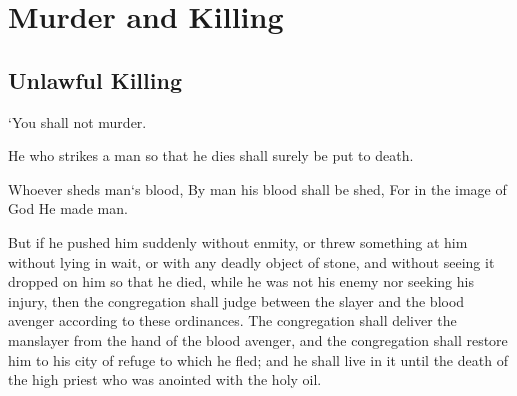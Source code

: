 \chapter{Murder and Killing}

\section{Unlawful Killing}

\begin{scripture}[Exodus 20:13]
    `You shall not murder.
\end{scripture}

\vspace{1\baselineskip}

\begin{scripture}[Exodus 21:12]
    He who strikes a man so that he dies shall surely be put to death.
\end{scripture}

\vspace{1\baselineskip}

\begin{scripture}[Genesis 9:6]
    Whoever sheds man`s blood, By man his blood shall be shed, For in the image of God He made man.
\end{scripture}

\vspace{1\baselineskip}

\begin{scripture}[Numbers 35:22-25]
    But if he pushed him suddenly without enmity, or threw something at him without lying in wait,
    or with any deadly object of stone, and without seeing it dropped on him so that he died, while he was not his enemy nor seeking his injury,
    then the congregation shall judge between the slayer and the blood avenger according to these ordinances.
    The congregation shall deliver the manslayer from the hand of the blood avenger, and the congregation shall restore him to his city of refuge to which he fled; and he shall live in it until the death of the high priest who was anointed with the holy oil.
\end{scripture}

\vspace{2\baselineskip}

